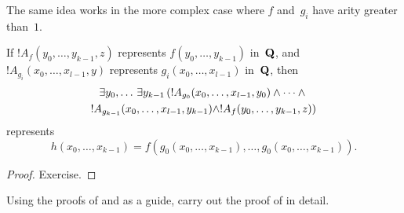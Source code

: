 \documentclass[../../../include/open-logic-section]{subfiles}
\begin{document}
The same idea works in the more complex case where $f$ and~$g_i$ have
arity greater than~$1$.

\begin{prop}
If $!A_f(y_0, \dots, y_{k-1}, z)$ represents $f(y_0, \dots, y_{k-1})$
in~$\mathbf{Q}$, and $!A_{g_i}(x_0, \dots, x_{l-1}, y)$ represents
$g_i(x_0, \dots, x_{l-1})$ in~$\mathbf{Q}$, then
\begin{multline*}
  \lexists[y_0,\dots][\lexists[y_{k-1}][(!A_{g_0}(x_0,\dots,x_{l-1},y_0) \land
      \dots \land {}]]\\
  !A_{g_{k-1}}(x_0,\dots,x_{l-1},y_{k-1}) \land !A_f(y_0,\dots,y_{k-1},z))
\end{multline*}
represents
\[
h(x_0, \dots, x_{k-1}) = f(g_0(x_0, \dots, x_{k-1}), \dots, g_0(x_0,
\dots, x_{k-1})).
\]
\end{prop}

\begin{proof}
Exercise.
\end{proof}

\begin{prob}
Using the proofs of  and
 as a guide, carry out the proof of
 in detail.
\end{prob}
\end{document}

